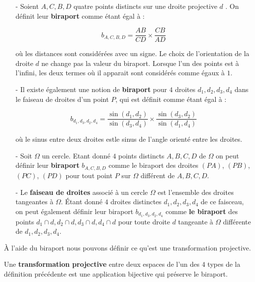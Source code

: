 \begin{defn}

\begin{itemize}

\item[-]Soient $A,C,B,D$ quatre points distincts sur une droite projective $d$
. On définit leur \textbf{biraport} comme étant égal à :

 $$b_{A,C,B,D}=\frac{AB}{CD}\times\frac{CB}{AD}$$
 
 où les distances sont considérées avec un signe. Le choix de l'orientation de la droite $d$ ne change pas la valeur du biraport. Lorsque l'un des points est à l'infini, les deux termes où il apparait sont considérés comme égaux à $1$.
 
\item[-] Il existe également une notion de \textbf{biraport} pour $4$ droites $d_1,d_2,d_3,d_4$ dans le faiseau de droites d'un point $P$, qui est définit comme étant égal à :
 
  $$b_{d_1,d_3,d_2,d_4}=\frac{\sin(d_1,d_2)}{\sin(d_3,d_4)}\times\frac{\sin(d_3,d_2)}{\sin(d_1,d_4)}$$
  
  où le sinus entre deux droites estle sinus de l'angle orienté entre les droites.
  
\item[-] Soit $\Omega$ un cercle. Etant donné $4$ points distincts $A,B,C,D$ de $\Omega$ on peut définir leur \textbf{biraport} $b_{A,C,B,D}$ comme le biraport des droites $(PA)$, $(PB)$, $(PC)$, $(PD)$ pour tout point $P$ sur $\Omega$ différent de $A,B,C,D$.

\medskip

\item[-]Le \textbf{faiseau de droites} associé à un cercle $\Omega$ est l'ensemble des droites tangeantes à $\Omega$. \'Etant donné $4$ droites distinctes $d_1,d_2,d_3,d_4$ de ce faisceau, on peut également définir leur biraport $b_{d_1,d_3,d_2,d_4}$ comme \textbf{le biraport} des points $d_1\cap d,d_2\cap d,d_3\cap d,d_4\cap d$ pour toute droite $d$ tangeante à $\Omega$ différente de $d_1,d_2,d_3,d_4$.

\end{itemize}
\end{defn}

À l'aide du biraport nous pouvons définir ce qu'est une transformation projective. 


\begin{defn}
Une \textbf{transformation projective} entre deux espaces de l'un des $4$ types de la définition précédente est une application bijective qui préserve le biraport.
\end{defn}

